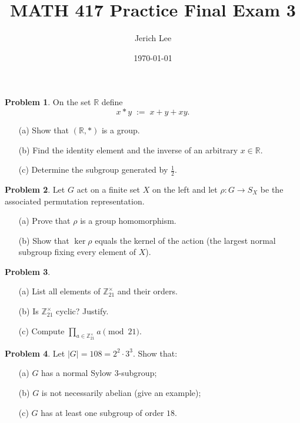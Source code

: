 \documentclass[12pt]{article}
\title{MATH 417 Practice Final Exam 3}
\author{Jerich Lee}
\date{\today}
\theoremstyle{definition} %
\newtheorem{problem}{Problem}
\theoremstyle{plain} %
\begin{document}
\maketitle
\newcommand{\Z}{\mathbb Z}
\newcommand{\Q}{\mathbb Q}
\newcommand{\R}{\mathbb R}

\bigskip
\begin{problem}
  On the set \(\R\) define
  \[
      x\ast y \;:=\; x+y+xy.
  \]
  \begin{enumerate}
      \item[(a)] Show that \((\R,\ast)\) is a group.
      \item[(b)] Find the identity element and the inverse of an arbitrary
                \(x\in\R\).
      \item[(c)] Determine the subgroup generated by \(\tfrac12\).
  \end{enumerate}
\end{problem}

\bigskip
\begin{problem}
  Let \(G\) act on a finite set \(X\) on the left and let
  \(\rho:G\to S_{X}\) be the associated permutation representation.
  \begin{enumerate}
      \item[(a)] Prove that \(\rho\) is a group homomorphism.
      \item[(b)] Show that \(\ker\rho\) equals the kernel of the action
                (the largest normal subgroup fixing every element of \(X\)).
  \end{enumerate}
\end{problem}

\bigskip
\begin{problem}
  \begin{enumerate}
      \item[(a)] List all elements of \(\Z_{21}^{\times}\) and their orders.
      \item[(b)] Is \(\Z_{21}^{\times}\) cyclic?  Justify.
      \item[(c)] Compute \(\prod_{a\in\Z_{21}^{\times}}a\pmod{21}\).
  \end{enumerate}
\end{problem}

\bigskip
\begin{problem}
  Let \(|G|=108=2^{2}\cdot3^{3}\).
  Show that:
  \begin{enumerate}
      \item[(a)] \(G\) has a normal Sylow \(3\)-subgroup;
      \item[(b)] \(G\) is not necessarily abelian (give an example);
      \item[(c)] \(G\) has at least one subgroup of order \(18\).
  \end{enumerate}
\end{problem}
\end{document}
